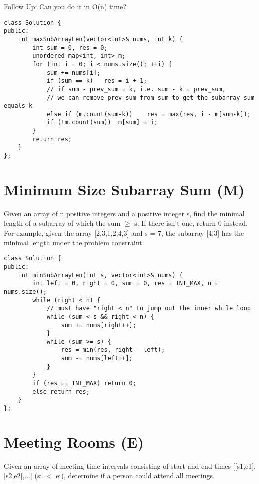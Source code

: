 Follow Up:
Can you do it in O(n) time? \\

\begin{lstlisting}
class Solution {
public:
    int maxSubArrayLen(vector<int>& nums, int k) {
        int sum = 0, res = 0;
        unordered_map<int, int> m;
        for (int i = 0; i < nums.size(); ++i) {
            sum += nums[i];
            if (sum == k)   res = i + 1;
            // if sum - prev_sum = k, i.e. sum - k = prev_sum,
            // we can remove prev_sum from sum to get the subarray sum equals k
            else if (m.count(sum-k))    res = max(res, i - m[sum-k]);
            if (!m.count(sum))  m[sum] = i;
        }
        return res;
    }
};
\end{lstlisting}


\section{Minimum Size Subarray Sum (M)}
Given an array of n positive integers and a positive integer s, find the minimal length of a subarray of which the sum $\geq$ s. If there isn't one, return 0 instead.\\

For example, given the array [2,3,1,2,4,3] and s = 7, the subarray [4,3] has the minimal length under the problem constraint. \\

\begin{lstlisting}
class Solution {
public:
    int minSubArrayLen(int s, vector<int>& nums) {
        int left = 0, right = 0, sum = 0, res = INT_MAX, n = nums.size();
        while (right < n) {
            // must have "right < n" to jump out the inner while loop
            while (sum < s && right < n) {  
                sum += nums[right++];
            }
            while (sum >= s) {
                res = min(res, right - left);
                sum -= nums[left++];
            }
        }
        if (res == INT_MAX) return 0;
        else return res;
    }
};
\end{lstlisting}


\section{Meeting Rooms (E)}
Given an array of meeting time intervals consisting of start and end times [[s1,e1],[s2,e2],...] (si $<$ ei), determine if a person could attend all meetings.\\


